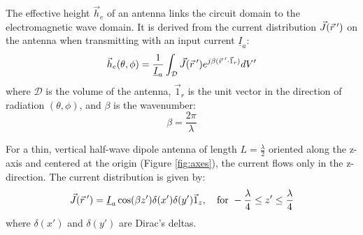 The effective height $\vec{h}_e$ of an antenna links the circuit domain to the electromagnetic wave domain. It is derived from the current distribution $\vec{J}(\vec{r}\hspace{0.2em}')$ on the antenna when transmitting with an input current $\underline{I}_a$:
\begin{equation}
    \vec{h}_e(\theta, \phi) = \frac{1}{\underline{I}_a} \int_{\mathcal{D}} \vec{J}(\vec{r}\hspace{0.2em}') e^{j\beta(\vec{r}\hspace{0.2em}' \cdot \vec{1}_r)} dV'
    \label{eq:he_general}
\end{equation}
\vspace{0.5em}
where $\mathcal{D}$ is the volume of the antenna, $\vec{1}_r$ is the unit vector in the direction of radiation $(\theta, \phi)$, and $\beta$ is the wavenumber:
\begin{equation}
    \beta = \frac{2\pi}{\lambda}
\end{equation}

For a thin, vertical half-wave dipole antenna of length $L=\frac{\lambda}{2}$ oriented along the z-axis and centered at the origin (Figure \ref{fig:axes}), the current flows only in the z-direction. The current distribution is given by:
\begin{equation}
    \vec{J}(\vec{r}\hspace{0.2em}') = \underline{I}_a \cos(\beta z') \delta(x') \delta(y') \vec{1}_z, \quad \text{for } -\frac{\lambda}{4} \le z' \le \frac{\lambda}{4}
\end{equation}
\vspace{0.5em}
where $\delta(x')$ and $\delta(y')$ are Dirac's deltas.

